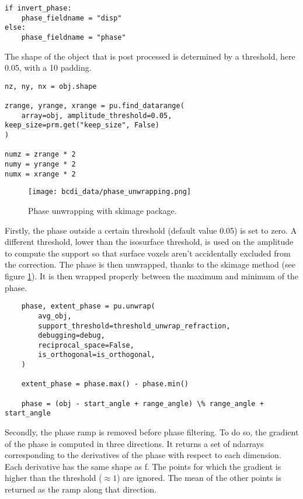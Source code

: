 \begin{verbatim}
if invert_phase:
    phase_fieldname = "disp"
else:
    phase_fieldname = "phase"
\end{verbatim}

The shape of the object that is post processed is determined by a threshold, here 0.05, with a 10 padding.
\begin{verbatim}
nz, ny, nx = obj.shape

zrange, yrange, xrange = pu.find_datarange(
	array=obj, amplitude_threshold=0.05, keep_size=prm.get("keep_size", False)
)

numz = zrange * 2
numy = yrange * 2
numx = xrange * 2
\end{verbatim}

\begin{figure}[ht]
    \centering
    \texttt{[image: bcdi\_data/phase\_unwrapping.png]}
    \caption{Phase unwrapping with skimage package.}
    \label{fig:phase_unwrap_skimage}
\end{figure}

Firstly, the phase outside a certain threshold (default value 0.05) is set to zero. A different threshold, lower than the isosurface threshold, is used on the amplitude to compute the support so that surface voxels aren't accidentally excluded from the correction.
The phase is then unwrapped, thanks to the skimage method (see figure \ref{fig:phase_unwrap_skimage}). It is then wrapped properly between the maximum and minimum of the phase.

\begin{verbatim}
    phase, extent_phase = pu.unwrap(
        avg_obj,
        support_threshold=threshold_unwrap_refraction,
        debugging=debug,
        reciprocal_space=False,
        is_orthogonal=is_orthogonal,
    )
    
    extent_phase = phase.max() - phase.min()
    
    phase = (obj - start_angle + range_angle) \% range_angle + start_angle
\end{verbatim}

Secondly, the phase ramp is removed before phase filtering. To do so, the gradient of the phase is computed in three directions. It returns a set of ndarrays corresponding to the derivatives of the phase with respect to each dimension. Each derivative has the same shape as f.
The points for which the gradient is higher than the threshold ($\approx 1$) are ignored. The mean of the other points is returned as the ramp along that direction.

